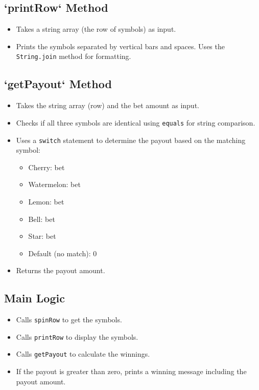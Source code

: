 \documentclass{article}
\begin{document}
\subsection*{`printRow` Method}
\begin{itemize}
    \item Takes a string array (the row of symbols) as input.
    \item Prints the symbols separated by vertical bars and spaces.  Uses the \texttt{String.join} method for formatting.
\end{itemize}

\subsection*{`getPayout` Method}
\begin{itemize}
    \item Takes the string array (row) and the bet amount as input.
    \item Checks if all three symbols are identical using \texttt{equals} for string comparison.
    \item Uses a \texttt{switch} statement to determine the payout based on the matching symbol:
    \begin{itemize}
        \item Cherry: bet 
        \item Watermelon: bet 
        \item Lemon: bet 
        \item Bell: bet 
        \item Star: bet 
        \item Default (no match): 0
    \end{itemize}
    \item Returns the payout amount.
\end{itemize}

\subsection*{Main Logic}
\begin{itemize}
    \item Calls \texttt{spinRow} to get the symbols.
    \item Calls \texttt{printRow} to display the symbols.
    \item Calls \texttt{getPayout} to calculate the winnings.
    \item If the payout is greater than zero, prints a winning message including the payout amount.
\end{itemize}
\end{document}
